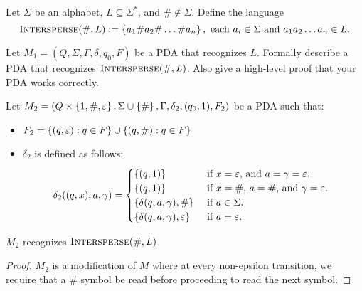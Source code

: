 \begin{problem}
  Let $\Sigma$ be an alphabet, $L \subseteq \Sigma^*$,
  and $\# \notin \Sigma$.
  Define the language
  \[ 
    \textsc{Intersperse}(\#, L) := 
    \left\{a_1 \# a_2 \# \ldots \# a_n\right\},
    \text{ each $a_i \in \Sigma$ and $a_1a_2 \ldots a_n \in L$}.
  \]

  \step
  Let $M_1 = (Q, \Sigma, \Gamma, \delta, q_0, F)$ be a PDA
  that recognizes $L$.
  Formally describe a PDA that recognizes $\textsc{Intersperse}(\#, L)$.
  Also give a high-level proof that your PDA works correctly.
\end{problem}
\begin{Answer}
  Let $M_2 = (Q \times \left\{1, \#, \varepsilon\right\}, \Sigma \cup \left\{\#\right\}, \Gamma, \delta_2, (q_0, 1), F_2)$ be a PDA
  such that:
  \begin{itemize}
    \item $F_2 = \left\{(q, \varepsilon): q \in F\right\} \cup \left\{(q, \#): q \in F\right\}$
    \item $\delta_2$ is defined as follows:
    \begin{align*}
      \delta_2((q, x), a, \gamma) = 
      \begin{cases}
        \left\{(q, 1)\right\} & \text{ if $x = \varepsilon$, and $a = \gamma = \varepsilon$. } \\
        \left\{(q, 1)\right\} & \text{ if $x = \#$, $a = \#$, and $\gamma = \varepsilon$. } \\
        \left\{\delta(q, a, \gamma), \#\right\} & \text{ if $a \in \Sigma$. } \\
        \left\{\delta(q, a, \gamma), \varepsilon\right\} & \text{ if $a = \varepsilon$. } \\
      \end{cases}
    \end{align*}
  \end{itemize}
  \begin{claim}
    $M_2$ recognizes $\textsc{Intersperse}(\#, L)$.

    \step
    \begin{proof}
      $M_2$ is a modification of $M$ where at every non-epsilon transition,
      we require that a $\#$ symbol be read before proceeding to
      read the next symbol.
    \end{proof}
  \end{claim}
\end{Answer}
